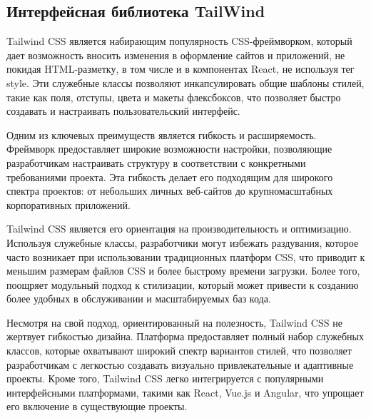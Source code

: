 \documentclass[master, och, diploma]{SCWorks}
\begin{document}
\subsection{Интерфейсная библиотека TailWind}
Tailwind CSS является набирающим популярность CSS-фреймворком, который дает возможность вносить изменения в оформление сайтов и приложений, не покидая HTML-разметку, в том числе и в компонентах React, не используя тег style. Эти служебные классы позволяют инкапсулировать общие шаблоны стилей, такие как поля, отступы, цвета и макеты флексбоксов, что позволяет быстро создавать и настраивать пользовательский интерфейс\cite{Tailwind}.

Одним из ключевых преимуществ является гибкость и расширяемость. Фреймворк предоставляет широкие возможности настройки, позволяющие разработчикам настраивать структуру в соответствии с конкретными требованиями проекта. Эта гибкость делает его подходящим для широкого спектра проектов: от небольших личных веб-сайтов до крупномасштабных корпоративных приложений.

Tailwind CSS является его ориентация на производительность и оптимизацию. Используя служебные классы, разработчики могут избежать раздувания, которое часто возникает при использовании традиционных платформ CSS, что приводит к меньшим размерам файлов CSS и более быстрому времени загрузки. Более того, поощряет модульный подход к стилизации, который может привести к созданию более удобных в обслуживании и масштабируемых баз кода.

Несмотря на свой подход, ориентированный на полезность, Tailwind CSS не жертвует гибкостью дизайна. Платформа предоставляет полный набор служебных классов, которые охватывают широкий спектр вариантов стилей, что позволяет разработчикам с легкостью создавать визуально привлекательные и адаптивные проекты. Кроме того, Tailwind CSS легко интегрируется с популярными интерфейсными платформами, такими как React, Vue.js и Angular, что упрощает его включение в существующие проекты\cite{Fain_2022}.
\end{document}
